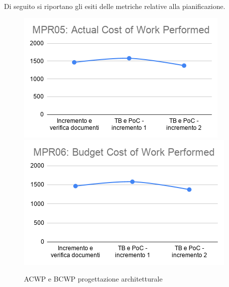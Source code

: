 \\
Di seguito si riportano gli esiti delle metriche relative alla pianificazione.
\begin{figure}[h!]
	\includegraphics[scale=0.6]{Immagini/ACWP_PArchitetturale.png}\quad
	\includegraphics[scale=0.6]{Immagini/BCWP_PArchitetturale.png}
	\caption{ACWP e BCWP progettazione architetturale}
	\label{fig:BCWP_PArchitetturale}
\end{figure}
